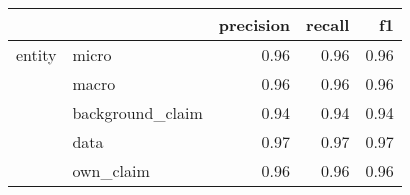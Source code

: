 \begin{tabular}{llrrr}
\toprule
       &           &  precision &  recall &   f1 \\
\midrule
entity & micro &       0.96 &    0.96 & 0.96 \\
       & macro &       0.96 &    0.96 & 0.96 \\
       & background\_claim &       0.94 &    0.94 & 0.94 \\
       & data &       0.97 &    0.97 & 0.97 \\
       & own\_claim &       0.96 &    0.96 & 0.96 \\
\bottomrule
\end{tabular}
